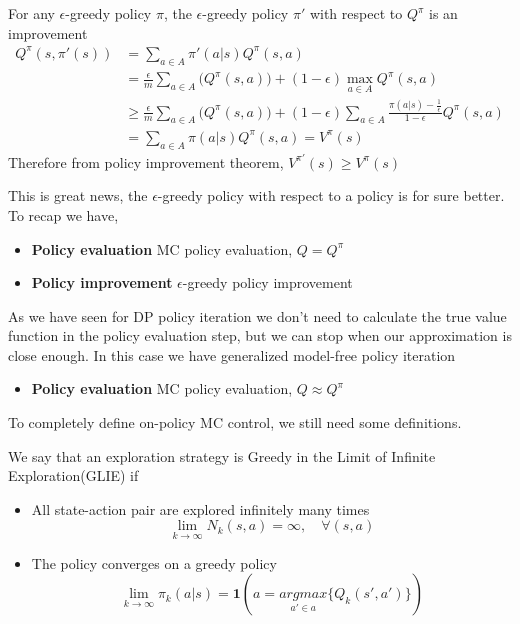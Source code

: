\documentclass[../main.tex]{subfiles}
\begin{document}
\begin{theorem}
    For any $\epsilon$-greedy policy $\pi$, the $\epsilon$-greedy policy $\pi'$ with respect to $Q^{\pi}$ is an improvement
    \begin{align*}
        Q^{\pi}(s,\pi'(s)) & = \sum_{a \in A} \pi'(a|s) Q^{\pi}(s,a)                                                                                                                       \\
                           & = \frac{\epsilon}{m} \sum_{a \in A} \big( Q^{\pi}(s,a) \big) + (1-\epsilon) \max_{a \in A} Q^{\pi}(s,a)                                                       \\
                           & \geq \frac{\epsilon}{m} \sum_{a \in A} \big( Q^{\pi}(s,a) \big) + (1-\epsilon) \sum_{a \in A} \frac{\pi(a|s) - \frac{1}{\epsilon}}{1 - \epsilon} Q^{\pi}(s,a) \\
                           & = \sum_{a \in A} \pi(a|s) Q^{\pi}(s,a) = V^{\pi}(s)
    \end{align*}
    Therefore from policy improvement theorem, $V^{\pi'}(s) \geq V^{\pi}(s)$
\end{theorem}
\par
\noindent
This is great news, the $\epsilon$-greedy policy with respect to a policy is for sure better.
To recap we have,
\begin{itemize}
    \item \textbf{Policy evaluation} MC policy evaluation, $Q=Q^{\pi}$
    \item \textbf{Policy improvement} $\epsilon$-greedy policy improvement
\end{itemize}
As we have seen for DP policy iteration we don't need to calculate the true value function in the policy evaluation step, but we can stop when our approximation is close enough. In this case we have generalized model-free policy iteration
\begin{itemize}
    \item \textbf{Policy evaluation} MC policy evaluation, $Q \approx Q^{\pi}$
\end{itemize}
To completely define on-policy MC control, we still need some definitions.
\begin{definition}[GLIE]
    We say that an exploration strategy is Greedy in the Limit of Infinite Exploration(GLIE) if
    \begin{itemize}
        \item All state-action pair are explored infinitely many times
              \begin{equation*}
                  \lim_{k \rightarrow \infty} N_k(s,a) = \infty, \quad \forall(s,a)
              \end{equation*}
        \item The policy converges on a greedy policy
              \begin{equation*}
                  \lim_{k \rightarrow \infty} \pi_k(a|s) = \mathbf{1}(a = \underset{a' \in a}{argmax}\{ Q_k(s',a') \})
              \end{equation*}
    \end{itemize}
\end{definition}
\end{document}
